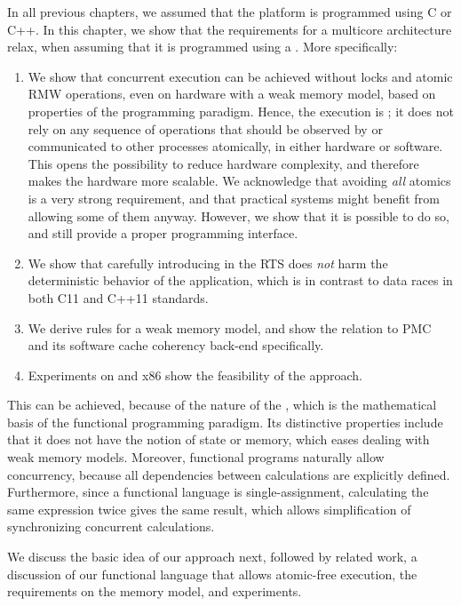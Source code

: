 In all previous chapters, we assumed that the platform is programmed using C or C++.
In this chapter, we show that the requirements for a multicore architecture relax, when assuming that it is programmed using a .
More specifically:
\begin{enumerate}
\item We show that concurrent execution can be achieved without locks and atomic \ac{RMW} operations, even on hardware with a weak memory model, based on properties of the programming paradigm.
	Hence, the execution is \emph{}; it does not rely on any sequence of operations that should be observed by or communicated to other processes atomically, in either hardware or software.
	This opens the possibility to reduce hardware complexity, and therefore makes the hardware more scalable.
	We acknowledge that avoiding \emph{all} atomics is a very strong requirement, and that practical systems might benefit from allowing some of them anyway.
	However, we show that it is possible to do so, and still provide a proper programming interface.
\item We show that carefully introducing  in the \acl{RTS} does \emph{not} harm the deterministic behavior of the application, which is in contrast to data races in both C11 and C++11 standards.
\item We derive rules for a weak memory model, and show the relation to \ac{PMC} and its software cache coherency back-end specifically.
\item Experiments on \Starburst and x86 show the feasibility of the approach. %
\end{enumerate}
This can be achieved, because of the nature of the \lcalc*, which is the mathematical basis of the functional programming paradigm.
Its distinctive properties include that it does not have the notion of state or memory, which eases dealing with weak memory models.
Moreover, functional programs naturally allow concurrency, because all dependencies between calculations are explicitly defined.
Furthermore, since a functional language is single-assignment, calculating the same expression twice gives the same result, which allows simplification of synchronizing concurrent calculations.

We discuss the basic idea of our approach next, followed by related work, a discussion of our functional language that allows atomic-free execution, the requirements on the memory model, and experiments.

